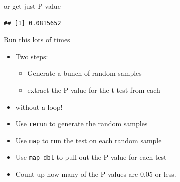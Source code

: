\documentclass[ignorenonframetext,]{beamer}
\newenvironment{Shaded}{\begin{snugshade}}{\end{snugshade}}
\newcommand{\DataTypeTok}[1]{\textcolor[rgb]{0.13,0.29,0.53}{#1}}
\newcommand{\DecValTok}[1]{\textcolor[rgb]{0.00,0.00,0.81}{#1}}
\newcommand{\KeywordTok}[1]{\textcolor[rgb]{0.13,0.29,0.53}{\textbf{#1}}}
\newcommand{\NormalTok}[1]{#1}
\newcommand{\OperatorTok}[1]{\textcolor[rgb]{0.81,0.36,0.00}{\textbf{#1}}}
\providecommand{\tightlist}{%
  \setlength{\itemsep}{0pt}\setlength{\parskip}{0pt}}
\begin{document}
\begin{frame}[fragile]{or get just P-value}
\protect\hypertarget{or-get-just-p-value}{}

\begin{Shaded}
\end{Shaded}

\begin{verbatim}
## [1] 0.0815652
\end{verbatim}

\end{frame}

\begin{frame}[fragile]{Run this lots of times}
\protect\hypertarget{run-this-lots-of-times}{}

\begin{itemize}
\tightlist
\item
  Two steps:

  \begin{itemize}
  \tightlist
  \item
    Generate a bunch of random samples
  \item
    extract the P-value for the t-test from each
  \end{itemize}
\item
  without a loop!
\item
  Use \texttt{rerun} to generate the random samples
\item
  Use \texttt{map} to run the test on each random sample
\item
  Use \texttt{map\_dbl} to pull out the P-value for each test
\item
  Count up how many of the P-values are 0.05 or less.
\end{itemize}

\end{frame}
\end{document}

